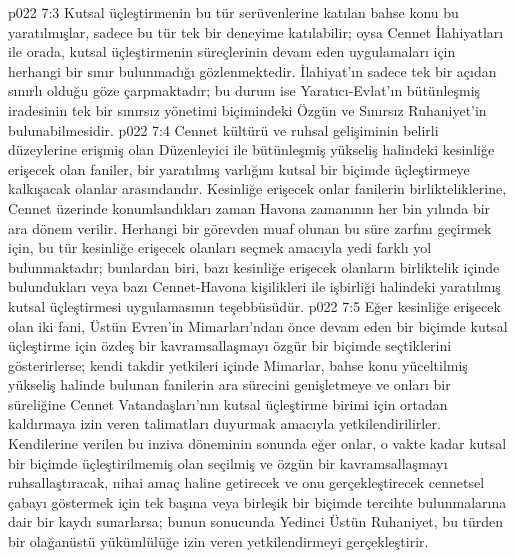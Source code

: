 \vs p022 7:3 Kutsal üçleştirmenin bu tür serüvenlerine katılan bahse konu bu yaratılmışlar, sadece bu tür tek bir deneyime katılabilir; oysa Cennet İlahiyatları ile orada, kutsal üçleştirmenin süreçlerinin devam eden uygulamaları için herhangi bir sınır bulunmadığı gözlenmektedir. İlahiyat’ın sadece tek bir açıdan sınırlı olduğu göze çarpmaktadır; bu durum ise Yaratıcı\hyp{}Evlat’ın bütünleşmiş iradesinin tek bir sınırsız yönetimi biçimindeki Özgün ve Sınırsız Ruhaniyet’in bulunabilmesidir.
\vs p022 7:4 Cennet kültürü ve ruhsal gelişiminin belirli düzeylerine erişmiş olan Düzenleyici ile bütünleşmiş yükseliş halindeki kesinliğe erişecek olan faniler, bir yaratılmış varlığını kutsal bir biçimde üçleştirmeye kalkışacak olanlar arasındandır. Kesinliğe erişecek onlar fanilerin birlikteliklerine, Cennet üzerinde konumlandıkları zaman Havona zamanının her bin yılında bir ara dönem verilir. Herhangi bir görevden muaf olunan bu süre zarfını geçirmek için, bu tür kesinliğe erişecek olanları seçmek amacıyla yedi farklı yol bulunmaktadır; bunlardan biri, bazı kesinliğe erişecek olanların birliktelik içinde bulundukları veya bazı Cennet\hyp{}Havona kişilikleri ile işbirliği halindeki yaratılmış kutsal üçleştirmesi uygulamasının teşebbüsüdür.
\vs p022 7:5 Eğer kesinliğe erişecek olan iki fani, Üstün Evren’in Mimarları’ndan önce devam eden bir biçimde kutsal üçleştirme için özdeş bir kavramsallaşmayı özgür bir biçimde seçtiklerini gösterirlerse; kendi takdir yetkileri içinde Mimarlar, bahse konu yüceltilmiş yükseliş halinde bulunan fanilerin ara sürecini genişletmeye ve onları bir süreliğine Cennet Vatandaşları’nın kutsal üçleştirme birimi için ortadan kaldırmaya izin veren talimatları duyurmak amacıyla yetkilendirilirler. Kendilerine verilen bu inziva döneminin sonunda eğer onlar, o vakte kadar kutsal bir biçimde üçleştirilmemiş olan seçilmiş ve özgün bir kavramsallaşmayı ruhsallaştıracak, nihai amaç haline getirecek ve onu gerçekleştirecek cennetsel çabayı göstermek için tek başına veya birleşik bir biçimde tercihte bulunmalarına dair bir kaydı sunarlarsa; bunun sonucunda Yedinci Üstün Ruhaniyet, bu türden bir olağanüstü yükümlülüğe izin veren yetkilendirmeyi gerçekleştirir.
